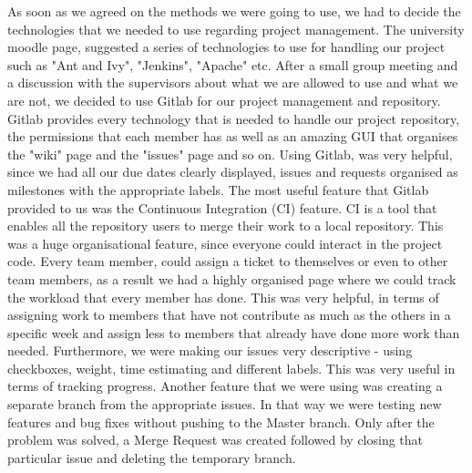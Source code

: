 \documentclass{l3proj}
\begin{document}
As soon as we agreed on the methods we were going to use, we had to decide the technologies that we needed to use regarding project management. The university moodle page, suggested a series of technologies to use for handling our project such as "Ant and Ivy", "Jenkins", "Apache" etc. After a small group meeting and a discussion with the supervisors about what we are allowed to use and what we are not, we decided to use Gitlab for our project management and repository. Gitlab provides every technology that is needed to handle our project repository, the permissions that each member has as well as an amazing GUI that organises the "wiki" page and the "issues" page and so on. Using Gitlab, was very helpful, since we had all our due dates clearly displayed, issues and requests organised as milestones with the appropriate labels. The most useful feature that Gitlab provided to us was the Continuous Integration (CI) feature. CI is a tool that enables all the repository users to merge their work to a local repository. This was a huge organisational feature, since everyone could interact in the project code. Every team member, could assign a ticket to themselves or even to other team members, as a result we had a highly organised page where we could track the workload that every member has done. This was very helpful, in terms of assigning work to members that have not contribute as much as the others in a specific week and assign less to members that already have done more work than needed. Furthermore, we were making our issues very descriptive - using checkboxes, weight, time estimating and different labels. This was very useful in terms of tracking progress. Another feature that we were using was creating a separate branch from the appropriate issues. In that way we were testing new features and bug fixes without pushing to the Master branch. Only after the problem was solved, a Merge Request was created followed by closing that particular issue and deleting the temporary branch. 
\end{document}
